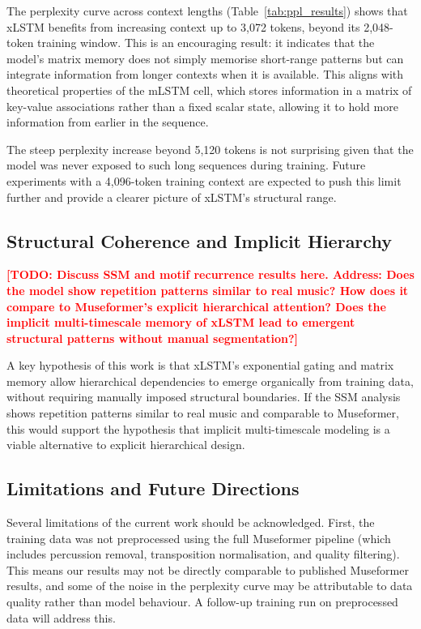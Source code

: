 \documentclass[conference]{IEEEtran}
\newcommand{\TODO}[1]{\textcolor{red}{\textbf{[TODO: #1]}}}
\begin{document}
The perplexity curve across context lengths (Table~\ref{tab:ppl_results})
shows that xLSTM benefits from increasing context up to 3,072 tokens,
beyond its 2,048-token training window. This is an encouraging result:
it indicates that the model's matrix memory does not simply memorise
short-range patterns but can integrate information from longer contexts
when it is available. This aligns with theoretical properties of the
mLSTM cell, which stores information in a matrix of key-value associations
rather than a fixed scalar state, allowing it to hold more information
from earlier in the sequence.

The steep perplexity increase beyond 5,120 tokens is not surprising
given that the model was never exposed to such long sequences during
training. Future experiments with a 4,096-token training context are
expected to push this limit further and provide a clearer picture of
xLSTM's structural range.

\subsection{Structural Coherence and Implicit Hierarchy}

\TODO{Discuss SSM and motif recurrence results here. Address:
Does the model show repetition patterns similar to real music?
How does it compare to Museformer's explicit hierarchical attention?
Does the implicit multi-timescale memory of xLSTM lead to emergent structural
patterns without manual segmentation?}

A key hypothesis of this work is that xLSTM's exponential gating and
matrix memory allow hierarchical dependencies to emerge organically from
training data, without requiring manually imposed structural boundaries.
If the SSM analysis shows repetition patterns similar to real music and
comparable to Museformer, this would support the hypothesis that implicit
multi-timescale modeling is a viable alternative to explicit hierarchical
design.

\subsection{Limitations and Future Directions}

Several limitations of the current work should be acknowledged. First,
the training data was not preprocessed using the full Museformer pipeline
(which includes percussion removal, transposition normalisation, and
quality filtering). This means our results may not be directly comparable
to published Museformer results, and some of the noise in the perplexity
curve may be attributable to data quality rather than model behaviour.
A follow-up training run on preprocessed data will address this.
\end{document}
